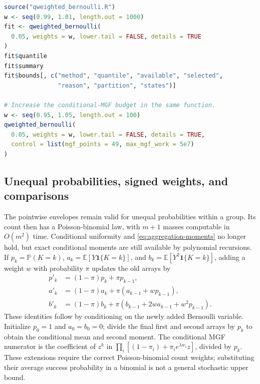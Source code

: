 \documentclass[11pt,letterpaper]{article}
\numberwithin{equation}{section}
\theoremstyle{definition}
\theoremstyle{remark}
\newcommand{\E}{\mathbb E}
\newcommand{\Pbb}{\mathbb P}
\begin{document}
\par\noindent\begin{minipage}{\linewidth}
\begin{lstlisting}[language=R]
source("qweighted_bernoulli.R")
w <- seq(0.99, 1.01, length.out = 1000)
fit <- qweighted_bernoulli(
  0.05, weights = w, lower.tail = FALSE, details = TRUE
)
fit$quantile
fit$summary
fit$bounds[, c("method", "quantile", "available", "selected",
               "reason", "partition", "states")]

# Increase the conditional-MGF budget in the same function.
w <- seq(0.95, 1.05, length.out = 100)
qweighted_bernoulli(
  0.05, weights = w, lower.tail = FALSE, details = TRUE,
  control = list(mgf_points = 49, max_mgf_work = 5e7)
)
\end{lstlisting}
\end{minipage}\par

\subsection{Unequal probabilities, signed weights, and comparisons}

The pointwise envelopes remain valid for unequal probabilities within a
group. Its count then has a Poisson-binomial law, with $m+1$ masses
computable in $O(m^2)$ time. Conditional uniformity and
\eqref{eq:aggregation-moments} no longer hold, but exact conditional
moments are still available by polynomial recursions. If
$p_k=\Pbb(K=k)$, $a_k=\E[Y\mathbf1\{K=k\}]$, and
$b_k=\E[Y^2\mathbf1\{K=k\}]$, adding a weight $w$ with probability
$\pi$ updates the old arrays by
\begin{equation}
 \begin{split}
 p'_k&=(1-\pi)p_k+\pi p_{k-1},\\
 a'_k&=(1-\pi)a_k+\pi(a_{k-1}+wp_{k-1}),\\
 b'_k&=(1-\pi)b_k+\pi(b_{k-1}+2wa_{k-1}+w^2p_{k-1}).
 \end{split}
 \label{eq:aggregation-unequal-moments}
\end{equation}
These identities follow by conditioning on the newly added Bernoulli
variable. Initialize $p_0=1$ and $a_0=b_0=0$; divide the final first and
second arrays by $p_k$ to obtain the conditional mean and second moment.
The conditional MGF numerator is the coefficient of $z^k$ in
$\prod_i[(1-\pi_i)+\pi_i e^{\lambda w_i}z]$, divided by $p_k$.
These extensions require the correct Poisson-binomial count weights;
substituting their average success probability in a binomial is not a
general stochastic upper bound.
\end{document}
